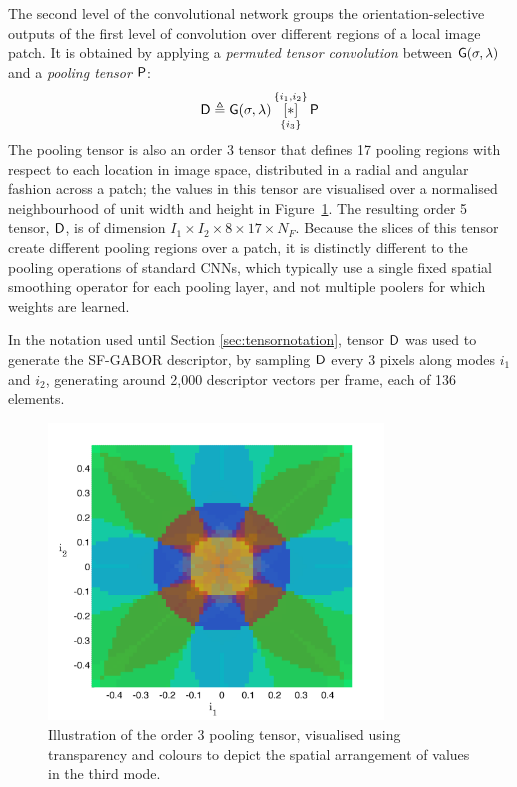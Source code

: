 The second level of the convolutional network groups the orientation-selective outputs of the first level of convolution over different regions of a local image patch. It is obtained by applying a \textit{permuted tensor convolution} between $\mathsf{G}(\sigma,\lambda)$ and a \textit{pooling tensor} $\mathsf{P}$:  
\begin{equation}
\mathsf{D} \triangleq \mathsf{G}(\sigma,\lambda) \, 
   \underset{\lbrace i_3 \rbrace}{\overset{\lbrace i_1,i_2\rbrace}{[ \ast ]}}\, {\mathsf{P}}
\end{equation}
The pooling tensor is also an order 3 tensor that defines 17 pooling regions with respect to each location in image space, distributed in a radial and angular fashion across a patch; the values in this tensor are visualised over a normalised neighbourhood of unit width and height in Figure~\ref{fig:PoolingTensor}. The resulting order 5 tensor, $\mathsf{D}$, is of dimension $I_1\times I_2 \times 8 \times 17 \times N_F$. Because the slices of this tensor create different pooling regions over a patch, it is distinctly different to the pooling operations of standard CNNs, which typically use a single fixed spatial smoothing operator for each pooling layer, and not multiple poolers for which weights are learned. 

In the notation used until Section \ref{sec:tensornotation}, tensor $\mathsf{D}$ was used to generate the SF-GABOR descriptor, by sampling $\mathsf{D}$ every 3 pixels along modes $i_1$ and $i_2$, generating around 2,000 descriptor vectors per frame, each of 136 elements.

\begin{figure}[!t]
\centering
\includegraphics[width=3.5in]{gfx/Chapter05/PoolingTensorRender.png}
\caption{Illustration of the order 3 pooling tensor, visualised using transparency and colours to depict the spatial arrangement of values in the third mode. }
\label{fig:PoolingTensor}
\end{figure}


